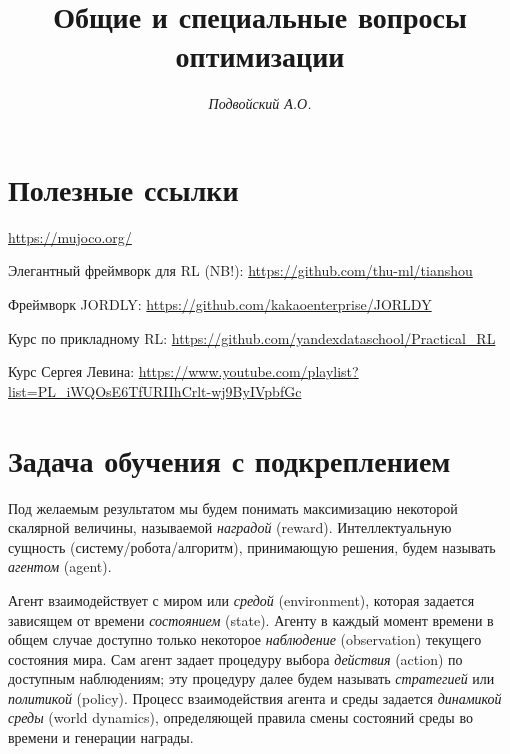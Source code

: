 \documentclass[%
	11pt,
	a4paper,
	utf8,
		]{article}
\begin{document}
\title{Общие и специальные вопросы оптимизации}

\author{\itshape Подвойский А.О.}

\date{}
\maketitle

\thispagestyle{fancy}




\tableofcontents

\section{Полезные ссылки}

\url{https://mujoco.org/}

Элегантный фреймворк для RL (NB!): \url{https://github.com/thu-ml/tianshou}

Фреймворк JORDLY: \url{https://github.com/kakaoenterprise/JORLDY}

Курс по прикладному RL: \url{https://github.com/yandexdataschool/Practical_RL}

Курс Сергея Левина: \url{https://www.youtube.com/playlist?list=PL_iWQOsE6TfURIIhCrlt-wj9ByIVpbfGc}

\section{Задача обучения с подкреплением}

Под желаемым результатом мы будем понимать максимизацию некоторой скалярной величины, называемой \emph{наградой} (reward). Интеллектуальную сущность (систему/робота/алгоритм), принимающую решения, будем называть \emph{агентом} (agent).

Агент взаимодействует с миром или \emph{средой} (environment), которая задается зависящем от времени \emph{состоянием} (state). Агенту в каждый момент времени в общем случае доступно только некоторое \emph{наблюдение} (observation) текущего состояния мира. Сам агент задает процедуру выбора \emph{действия} (action) по доступным наблюдениям; эту процедуру далее будем называть \emph{стратегией} или \emph{политикой} (policy). Процесс взаимодействия агента и среды задается \emph{динамикой среды} (world dynamics), определяющей правила смены состояний среды во времени и генерации награды.
\end{document}
